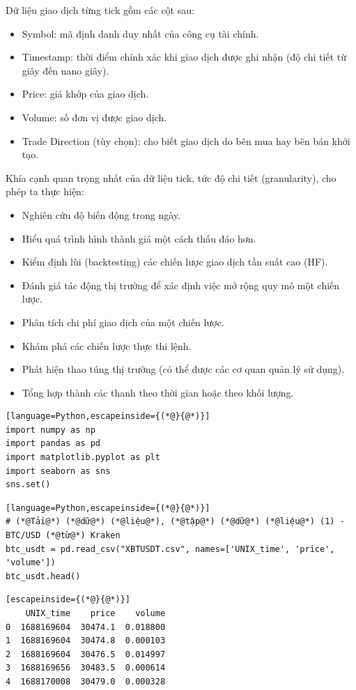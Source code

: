 Dữ liệu giao dịch từng tick gồm các cột sau:

\begin{itemize}
  \item Symbol: mã định danh duy nhất của công cụ tài chính.
  \item Timestamp: thời điểm chính xác khi giao dịch được ghi nhận (độ chi tiết từ giây đến nano giây).
  \item Price: giá khớp của giao dịch.
  \item Volume: số đơn vị được giao dịch.
  \item Trade Direction (tùy chọn): cho biết giao dịch do bên mua hay bên bán khởi tạo.
\end{itemize}

Khía cạnh quan trọng nhất của dữ liệu tick, tức độ chi tiết (granularity), cho phép ta thực hiện:

\begin{itemize}
  \item Nghiên cứu độ biến động trong ngày.
  \item Hiểu quá trình hình thành giá một cách thấu đáo hơn.
  \item Kiểm định lùi (backtesting) các chiến lược giao dịch tần suất cao (HF).
  \item Đánh giá tác động thị trường để xác định việc mở rộng quy mô một chiến lược.
  \item Phân tích chi phí giao dịch của một chiến lược.
  \item Khám phá các chiến lược thực thi lệnh.
  \item Phát hiện thao túng thị trường (có thể được các cơ quan quản lý sử dụng).
  \item Tổng hợp thành các thanh theo thời gian hoặc theo khối lượng.
\end{itemize}

\begin{lstlisting}[language=Python,escapeinside={(*@}{@*)}]
import numpy as np
import pandas as pd
import matplotlib.pyplot as plt
import seaborn as sns
sns.set()
\end{lstlisting}

\begin{lstlisting}[language=Python,escapeinside={(*@}{@*)}]
# (*@Tải@*) (*@dữ@*) (*@liệu@*), (*@tập@*) (*@dữ@*) (*@liệu@*) (1) - BTC/USD (*@từ@*) Kraken
btc_usdt = pd.read_csv("XBTUSDT.csv", names=['UNIX_time', 'price', 'volume'])
btc_usdt.head()
\end{lstlisting}

\begin{lstlisting}[escapeinside={(*@}{@*)}]
    UNIX_time    price    volume
0  1688169604  30474.1  0.018800
1  1688169604  30474.8  0.000103
2  1688169604  30476.5  0.014997
3  1688169656  30483.5  0.000614
4  1688170008  30479.0  0.000328
\end{lstlisting}

